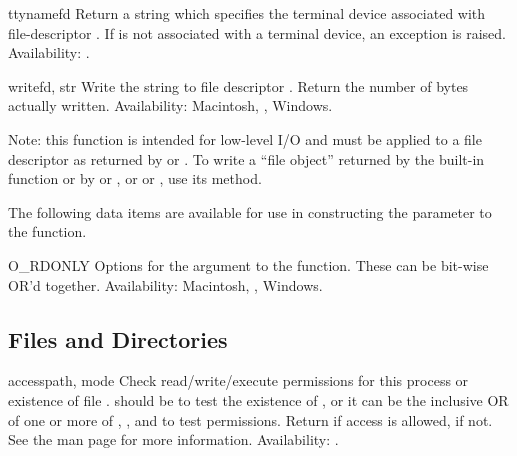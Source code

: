 \begin{funcdesc}{ttyname}{fd}
Return a string which specifies the terminal device associated with
file-descriptor .  If  is not associated with a terminal
device, an exception is raised.
Availability: \UNIX{}.
\end{funcdesc}

\begin{funcdesc}{write}{fd, str}
Write the string  to file descriptor .
Return the number of bytes actually written.
Availability: Macintosh, \UNIX{}, Windows.

Note: this function is intended for low-level I/O and must be applied
to a file descriptor as returned by  or
.  To write a ``file object'' returned by the
built-in function  or by  or
, or  or , use
its  method.
\end{funcdesc}


The following data items are available for use in constructing the
 parameter to the  function.

\begin{datadesc}{O_RDONLY}
Options for the  argument to the  function.
These can be bit-wise OR'd together.
Availability: Macintosh, \UNIX{}, Windows.
\end{datadesc}


\subsection{Files and Directories \label{os-file-dir}}

\begin{funcdesc}{access}{path, mode}
Check read/write/execute permissions for this process or existence of
file .   should be  to test the
existence of , or it can be the inclusive OR of one or more
of , , and  to test
permissions.  Return  if access is allowed,  if not.
See the \UNIX{} man page  for more information.
Availability: \UNIX{}.
\end{funcdesc}

